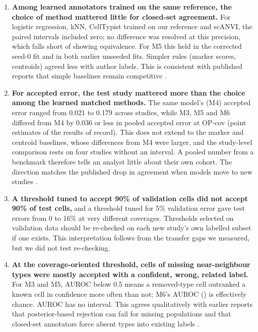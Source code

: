 \documentclass[11pt]{article}
\begin{document}
\begin{enumerate}
\item \textbf{Among learned annotators trained on the same reference, the choice of method mattered little for closed-set agreement.} For logistic regression, kNN, CellTypist trained on our reference and scANVI, the paired intervals included zero; no difference was resolved at this precision, which falls short of showing equivalence. For M5 this held in the corrected seed-0 fit and in both earlier unseeded fits. Simpler rules (marker scores, centroids) agreed less with author labels. This is consistent with published reports that simple baselines remain competitive \citep{boiarsky2023,kedzierska2025,denadel2026}.
\item \textbf{For accepted error, the test study mattered more than the choice among the learned matched methods.} The same model's (M4) accepted error ranged from 0.021 to 0.179 across studies, while M3, M5 and M6 differed from M4 by 0.036 or less in pooled accepted error at OP-cov (point estimates of the results of record). This does not extend to the marker and centroid baselines, whose differences from M4 were larger, and the study-level comparison rests on four studies without an interval. A pooled number from a benchmark therefore tells an analyst little about their own cohort. The direction matches the published drop in agreement when models move to new studies \citep{cultrera2026hce}.
\item \textbf{A threshold tuned to accept 90\% of validation cells did not accept 90\% of test cells,} and a threshold tuned for 5\% validation error gave test errors from 0 to 16\% at very different coverages. Thresholds selected on validation data should be re-checked on each new study's own labelled subset if one exists. This interpretation follows from the transfer gaps we measured, but we did not test re-checking.
\item \textbf{At the coverage-oriented threshold, cells of missing near-neighbour types were mostly accepted with a confident, wrong, related label.} For M3 and M5, AUROC below 0.5 means a removed-type cell outranked a known cell in confidence more often than not; M6's AUROC () is effectively chance. AUROC has no interval. This agrees qualitatively with earlier reports that posterior-based rejection can fail for missing populations \citep{abdelaal2019} and that closed-set annotators force absent types into existing labels \citep{hu2025matching}.
\end{enumerate}
\end{document}
